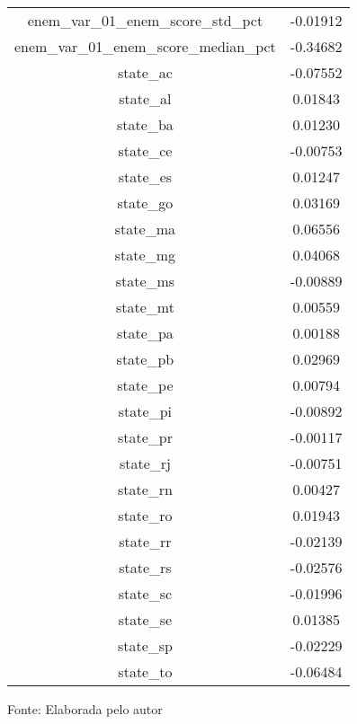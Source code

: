 \begin{table}[h]
\begin{tabular}{cc}
enem_var_01_enem_score_std_pct  & -0.01912 \\
enem_var_01_enem_score_median_pct  & -0.34682 \\
state_ac  & -0.07552 \\
state_al &  0.01843 \\
state_ba &  0.01230 \\
state_ce  & -0.00753 \\
state_es &  0.01247 \\
state_go &  0.03169 \\
state_ma &  0.06556 \\
state_mg &  0.04068 \\
state_ms  & -0.00889 \\
state_mt &  0.00559 \\
state_pa &  0.00188 \\
state_pb &  0.02969 \\
state_pe &  0.00794 \\
state_pi  & -0.00892 \\
state_pr  & -0.00117 \\
state_rj  & -0.00751 \\
state_rn &  0.00427 \\
state_ro &  0.01943 \\
state_rr  & -0.02139 \\
state_rs  & -0.02576 \\
state_sc  & -0.01996 \\
state_se &  0.01385 \\
state_sp  & -0.02229 \\
state_to  & -0.06484 \\
\hline
\end{tabular}

Fonte: Elaborada pelo autor
\end{table}
